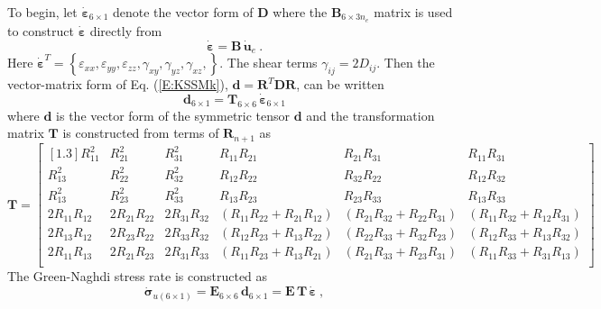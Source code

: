\documentclass[11pt]{report}
\numberwithin{equation}{section}
\newcommand{\bmf } {\boldsymbol }  %
\newcommand{\nid}{\noindent}
\newcommand{\vareps}{\varepsilon}
\begin{document}
To begin, let $\dot{\bmf{\vareps}}_{6 \times 1}$ denote the vector form of $\mathbf{D}$
where the $\mathbf{B}_{6 \times 3n_e}$ matrix is used to construct $\dot{\bmf{\vareps}}$
directly from
%
\begin{equation}\label{E:SRCTk}
\dot{\bmf{\vareps}} = \mathbf{B} \,\dot{\bmf{u}}_e\ .
\end{equation}
%
Here $\dot{\bmf{\vareps}} ^T =
\left\{\vareps_{xx},\vareps_{yy},\vareps_{zz}, \gamma_{xy}, \gamma_{yz}, \gamma_{xz},\right\}$.
The shear terms $\gamma_{ij} = 2 D_{ij}$.
Then the vector-matrix form of Eq. (\ref{E:KSSMk}),
$\mathbf{d} = \mathbf{R}^T \mathbf{D}\mathbf{R}$,
can be written
%
\begin{equation}\label{E:SRCTl}
\bmf{d}_{6 \times 1} =  \mathbf{T}_{6 \times 6}\,\dot{\bmf{\vareps}}_{6 \times 1}
\end{equation}
%
\nid where $\bmf{d}$ is the vector form of the symmetric tensor $\mathbf{d}$ and the transformation
matrix $\mathbf{T}$ is constructed from terms of $\mathbf{R}_{n+1}$ as
%
\scriptsize
\begin{equation}\label{E:SRCTm}
 \mathbf{T} = \begin{bmatrix} [1.3]
R_{11}^2 & R_{21}^2 & R_{31}^2 &R_{11}R_{21}& R_{21}R_{31} & R_{11}R_{31} \\
 R_{13}^2 & R_{22}^2 &R_{32}^2&R_{12}R_{22} &R_{32}R_{22} &R_{12}R_{32} \\
 R_{13}^2 &R_{23}^2 &R_{33}^2 &R_{13}R_{23}  & R_{23}R_{33}  & R_{13}R_{33}  \\
  2R_{11}R_{12} & 2R_{21}R_{22} & 2R_{31}R_{32} & \left (  R_{11}R_{22}+R_{21}R_{12} \right ) &
           \left (  R_{21}R_{32}+R_{22}R_{31} \right )    & \left (  R_{11}R_{32}+R_{12}R_{31} \right ) \\ 
2 R_{13}R_{12}  & 2 R_{23}R_{22}  & 2 R_{33}R_{32} & \left (  R_{12}R_{23}+R_{13}R_{22} \right )   & 
       \left (  R_{22}R_{33}+R_{32}R_{23} \right ) & \left (  R_{12}R_{33}+R_{13}R_{32} \right )  \\ 
2R_{11}R_{13}  & 2R_{21}R_{23}   & 2R_{31}R_{33}&\left (  R_{11}R_{23}+R_{13}R_{21} \right )&
         \left (  R_{21}R_{33}+R_{23}R_{31} \right ) & \left (  R_{11}R_{33}+R_{31}R_{13} \right ) \\
\end{bmatrix}
\end{equation}
\normalsize
%
\nid The Green-Naghdi stress rate is constructed as
%
\begin{equation}\label{E:SRCTn}
\dot{\bmf{\sigma}}_{u( 6 \times 1)} =  \mathbf{E}_{6\times 6}\,\bmf{d}_{6\times 1}=\mathbf{E}\,\mathbf{T}\, \dot{\bmf{\vareps}}\ ,
\end{equation}
\end{document}
